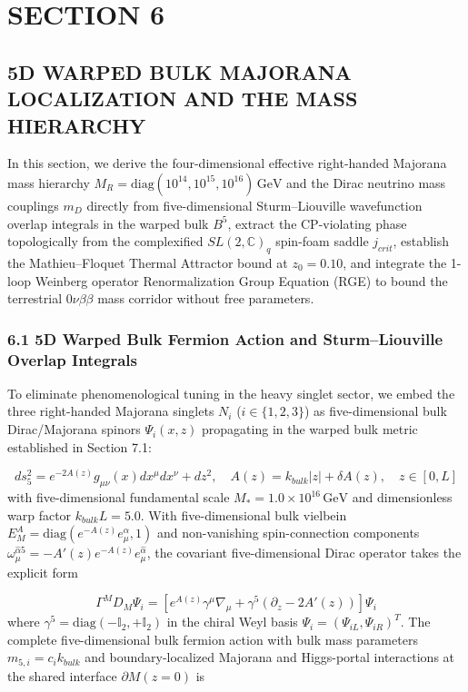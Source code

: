 \documentclass[aps,prd,onecolumn,superscriptaddress,nofootinbib,longbibliography,10pt]{revtex4-2}
\begin{document}
\section*{SECTION 6}


\subsection*{5D WARPED BULK MAJORANA LOCALIZATION AND THE MASS HIERARCHY}

In this section, we derive the four-dimensional effective right-handed Majorana mass hierarchy \(M_R = \mathrm{diag}(10^{14}, 10^{15}, 10^{16})\,\mathrm{GeV}\) and the Dirac neutrino mass couplings \(m_D\) directly from five-dimensional Sturm--Liouville wavefunction overlap integrals in the warped bulk \(B^5\), extract the CP-violating phase topologically from the complexified \(SL(2,\mathbb{C})_q\) spin-foam saddle \(j_{crit}\), establish the Mathieu--Floquet Thermal Attractor bound at \(z_0 = 0.10\), and integrate the 1-loop Weinberg operator Renormalization Group Equation (RGE) to bound the terrestrial \(0\nu\beta\beta\) mass corridor without free parameters.




\subsubsection*{6.1 5D Warped Bulk Fermion Action and Sturm--Liouville Overlap Integrals}

To eliminate phenomenological tuning in the heavy singlet sector, we embed the three right-handed Majorana singlets \(N_i\) (\(i \in \{1,2,3\}\)) as five-dimensional bulk Dirac/Majorana spinors \(\Psi_i(x,z)\) propagating in the warped bulk metric established in Section 7.1:


\[ds_5^2 = e^{-2A(z)}g_{\mu\nu}(x)dx^\mu dx^\nu + dz^2, \quad A(z) = k_{bulk}\vert z\vert + \delta A(z), \quad z \in [0,L]\]
with five-dimensional fundamental scale \(M_* = 1.0 \times 10^{16}\,\mathrm{GeV}\) and dimensionless warp factor \(k_{bulk}L = 5.0\). With five-dimensional bulk vielbein \(E_M^A = \mathrm{diag}(e^{-A(z)}e_\mu^\alpha, 1)\) and non-vanishing spin-connection components \(\omega_\mu^{\hat{\alpha}5} = -A'(z)e^{-A(z)}e_\mu^{\hat{\alpha}}\), the covariant five-dimensional Dirac operator takes the explicit form


\[\Gamma^M D_M \Psi_i = \left[ e^{A(z)}\gamma^\mu \nabla_\mu + \gamma^5 (\partial_z - 2A'(z)) \right] \Psi_i\]
where \(\gamma^5 = \mathrm{diag}(-\mathbb{I}_2, +\mathbb{I}_2)\) in the chiral Weyl basis \(\Psi_i = (\Psi_{iL}, \Psi_{iR})^T\). The complete five-dimensional bulk fermion action with bulk mass parameters \(m_{5,i} = c_i k_{bulk}\) and boundary-localized Majorana and Higgs-portal interactions at the shared interface \(\partial M (z=0)\) is
\end{document}
